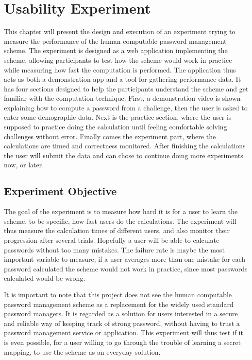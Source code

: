 \chapter{Usability Experiment}\label{ch:experiment}
This chapter will present the design and execution of an experiment trying to measure  the performance of the human computable password management scheme. The experiment is designed as a web application implementing the scheme, allowing participants to test how the scheme would work in practice while measuring how fast the computation is performed. The application thus acts as both a demonstration app and a tool for gathering performance data. It has four sections designed to help the participants understand the scheme and get familiar with the computation technique. First, a demonstration video is shown explaining how to compute a password from a challenge, then the user is asked to enter some demographic data. Next is the practice section, where the user is supposed to practice doing the calculation until feeling comfortable solving challenges without error. Finally comes the experiment part, where the calculations are timed and correctness monitored. After finishing the calculations the user will submit the data and can chose to continue doing more experiments now, or later.
\section{Experiment Objective}
The goal of the experiment is to measure how hard it is for a user to learn the scheme, to be specific, how fast users do the calculations. The experiment will thus measure the calculation times of different users, and also monitor their progression after several trials. Hopefully a user will be able to calculate passwords without too many mistakes. The failure rate is maybe the most important variable to measure; if a user averages more than one mistake for each password calculated the scheme would not work in practice, since most passwords calculated would be wrong. 
\par It is important to note that this project does not see the human computable password management scheme as a replacement for the widely used standard password managers. It is regarded as a solution for users interested in a secure and reliable way of keeping track of strong password, without having to trust a password management service or application. This experiment will thus test if it is even possible, for a user willing to go through the trouble of learning a secret mapping, to use the scheme as an everyday solution.

